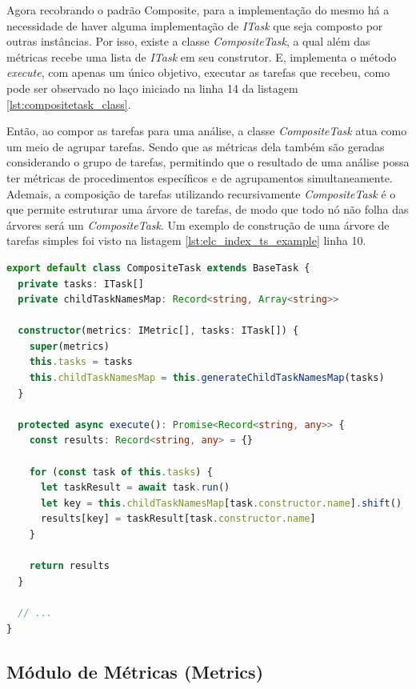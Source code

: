 \documentclass[12pt]{tcc}
\begin{document}
	Agora recobrando o padrão Composite, para a implementação do mesmo há a necessidade de haver alguma implementação de \emph{ITask} que seja composto por outras instâncias.
	Por isso, existe a classe \emph{CompositeTask}, a qual além das métricas recebe uma lista de \emph{ITask} em seu construtor.
	E, implementa o método \emph{execute}, com apenas um único objetivo, executar as tarefas que recebeu, como pode ser observado no laço iniciado na linha 14 da listagem \ref{lst:compositetask_class}.

	Então, ao compor as tarefas para uma análise, a classe \emph{CompositeTask} atua como um meio de agrupar tarefas.
	Sendo que as métricas dela também são geradas considerando o grupo de tarefas, permitindo que o resultado de uma análise possa ter métricas de procedimentos específicos e de agrupamentos simultaneamente.
	Ademais, a composição de tarefas utilizando recursivamente \emph{CompositeTask} é o que permite estruturar uma árvore de tarefas, de modo que todo nó não folha das árvores será um \emph{CompositeTask}.
	Um exemplo de construção de uma árvore de tarefas simples foi visto na listagem \ref{lst:elc_index_ts_example} linha 10.

\begin{lstlisting}[label={lst:compositetask_class}, caption={Fragmento de código da classe \emph{CompositeTask}, fundamental na implementação do padrão de projeto composite \ref{subsection:composite}.}, language=TypeScript, breaklines=true]
export default class CompositeTask extends BaseTask {
  private tasks: ITask[]
  private childTaskNamesMap: Record<string, Array<string>>

  constructor(metrics: IMetric[], tasks: ITask[]) {
    super(metrics)
    this.tasks = tasks
    this.childTaskNamesMap = this.generateChildTaskNamesMap(tasks)
  }

  protected async execute(): Promise<Record<string, any>> {
    const results: Record<string, any> = {}

    for (const task of this.tasks) {
      let taskResult = await task.run()
      let key = this.childTaskNamesMap[task.constructor.name].shift() || task.constructor.name
      results[key] = taskResult[task.constructor.name]
    }

    return results
  }

  // ...
}

\end{lstlisting}


	\subsection{Módulo de Métricas (Metrics)}
	\label{subsection:modulo-metrics}
\end{document}
